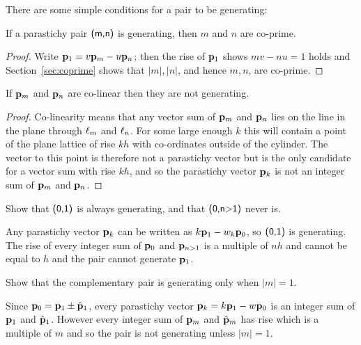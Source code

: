 There are some simple conditions for a pair to be generating:
\begin{theorem}
	\label{thm:coprime1}
	If a parastichy pair $\textsf{(m,n)}$ is generating, then $m$ and $n$ are co-prime.  
\end{theorem}
\begin{proof}
	Write ${\mathbf p}_{1}= v{\mathbf p}_{m}-u{\mathbf p}_{n}$; then the rise of ${\mathbf p}_{1}$ shows $mv-nu = 1$ holds and Section~\ref{sec:coprime} shows that $|m|,|n|$, and hence $m,n$, are co-prime.
\end{proof}
\begin{theorem}
	\label{thm:coprime}
	If ${\mathbf p}_{m}$ and ${\mathbf p}_{n}$ are co-linear then they are not generating.
\end{theorem}
\begin{proof}
	Co-linearity means that any vector sum of ${\mathbf p}_{m}$ and ${\mathbf p}_{n}$ lies on the line in the plane through $\ell_{{m}}$ and $\ell_{{n}}$. For some large enough $k$ this will contain a point of the plane lattice of rise $kh$ with co-ordinates outside of the cylinder. The vector to this point is therefore not a parastichy vector but is the only candidate for a vector sum with rise $kh$, and so the parastichy vector ${\mathbf p}_{k}$ is not an integer sum of ${\mathbf p}_{m}$ and ${\mathbf p}_{n}$.
\end{proof}
\begin{jExercise}
	\label{ex:01generating}
	Show that $\textsf{(0,1)}$ is always generating, and that  $\textsf{(0,n>1)}$ never is. 
\end{jExercise}
\begin{jAnswer}
	Any parastichy vector ${\mathbf p}_{k}$ can be written as $k{\mathbf p}_{1}-w_k {\mathbf p}_{0}$, so $\textsf{(0,1)}$ is generating. The rise of every integer sum of ${\mathbf p}_{0}$ and ${\mathbf p}_{n>1}$ is a multiple of $nh$ and cannot be equal to $h$ and the pair cannot generate ${\mathbf p}_{1}$.
	
\end{jAnswer}
\begin{jExercise}
	Show that the complementary pair  is generating only when $|m|=1$.
\end{jExercise}
\begin{jAnswer}
	Since ${\mathbf p}_{0}={\mathbf p}_{1}\pm\hat{\mathbf p}_{1}$, every parastichy vector ${\mathbf p}_{k}=k{\mathbf p}_{1}-w{\mathbf p}_{0}$ is an integer sum of ${\mathbf p}_{1}$ and $\hat{\mathbf p}_{1}$. However every integer sum of
	${\mathbf p}_{m}$ and $\hat{\mathbf p}_{m}$ has rise which is a multiple of $m$ and so the pair is not generating unless $|m|=1$. 
\end{jAnswer}




